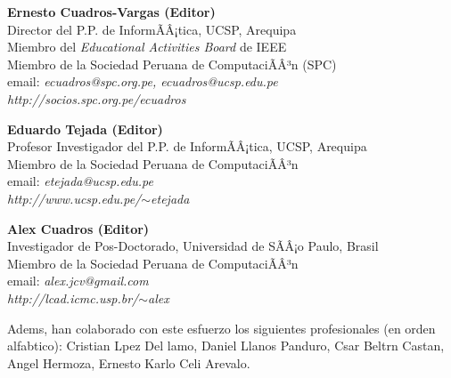 \begin{center}
\textbf{Ernesto Cuadros-Vargas (Editor)}\\
Director del P.P. de InformÃÂ¡tica, UCSP, Arequipa\\
Miembro del \textit{Educational Activities Board} de IEEE\\
Miembro de la Sociedad Peruana de ComputaciÃÂ³n (SPC)\\
email: \textit{ecuadros@spc.org.pe, ecuadros@ucsp.edu.pe}\\
\textit{http://socios.spc.org.pe/ecuadros}
\end{center}

\begin{center}
\textbf{Eduardo Tejada (Editor)}\\
Profesor Investigador del P.P. de InformÃÂ¡tica, UCSP, Arequipa\\
Miembro de la Sociedad Peruana de ComputaciÃÂ³n\\
email: \textit{etejada@ucsp.edu.pe}\\
\textit{http://www.ucsp.edu.pe/$\sim$etejada}
\end{center}

\begin{center}
\textbf{Alex Cuadros (Editor)}\\
Investigador de Pos-Doctorado, Universidad de SÃÂ¡o Paulo, Brasil\\
Miembro de la Sociedad Peruana de ComputaciÃÂ³n\\
email: \textit{alex.jcv@gmail.com}\\
\textit{http://lcad.icmc.usp.br/$\sim$alex}
\end{center}

Adem s, han colaborado con este esfuerzo los siguientes profesionales (en orden alfab tico): Cristian L pez Del  lamo, Daniel Llanos Panduro, C sar Beltr n Casta  n, Angel Hermoza, Ernesto Karlo Celi Arevalo.




